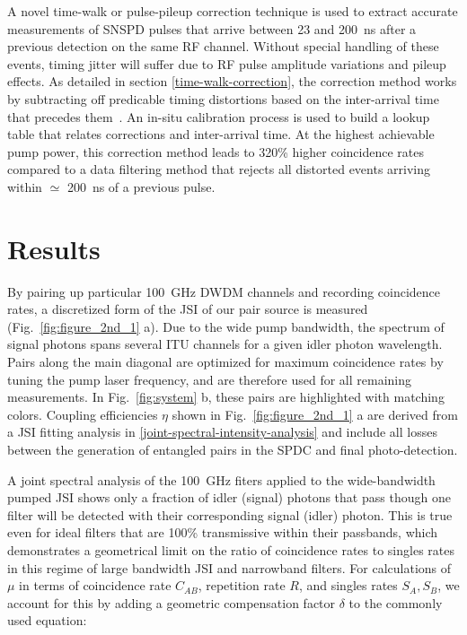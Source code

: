 \documentclass[11pt]{caltech_thesis} %
\begin{document}
A novel time-walk or pulse-pileup correction technique is used to extract accurate measurements of SNSPD pulses that arrive between 23 and 200~ns after a previous detection on the same RF channel. Without special handling of these events, timing jitter will suffer due to RF pulse amplitude variations and pileup effects. As detailed in section \ref{time-walk-correction}, the correction method works by subtracting off predicable timing distortions based on the inter-arrival time that precedes them~\autocite{Mueller2023,Craiciu23}. An in-situ calibration process is used to build a lookup table that relates corrections and inter-arrival time. At the highest achievable pump power, this correction method leads to 320\% higher coincidence rates compared to a data filtering method that rejects all distorted events arriving within $\simeq$ 200~ns of a previous pulse.

\hypertarget{results-2}{%
\section{Results}\label{results-2}}

By pairing up particular 100~GHz DWDM channels and recording coincidence rates, a discretized form of the JSI of our pair source is measured (Fig.~\ref{fig:figure_2nd_1} a). Due to the wide pump bandwidth, the spectrum of signal photons spans several ITU channels for a given idler photon wavelength. Pairs along the main diagonal are optimized for maximum coincidence rates by tuning the pump laser frequency, and are therefore used for all remaining measurements. In Fig.~\ref{fig:system} b, these pairs are highlighted with matching colors. Coupling efficiencies $\eta$ shown in Fig.~\ref{fig:figure_2nd_1} a are derived from a JSI fitting analysis in \ref{joint-spectral-intensity-analysis} and include all losses between the generation of entangled pairs in the SPDC and final photo-detection.

A joint spectral analysis of the 100~GHz fiters applied to the wide-bandwidth pumped JSI shows only a fraction of idler (signal) photons that pass though one filter will be detected with their corresponding signal (idler) photon. This is true even for ideal filters that are 100\% transmissive within their passbands, which demonstrates a geometrical limit on the ratio of coincidence rates to singles rates in this regime of large bandwidth JSI and narrowband filters. For calculations of $\mu$ in terms of coincidence rate $C_{AB}$, repetition rate $R$, and singles rates $S_A, S_B$, we account for this by adding a geometric compensation factor $\delta$ to the commonly used equation:
\end{document}
